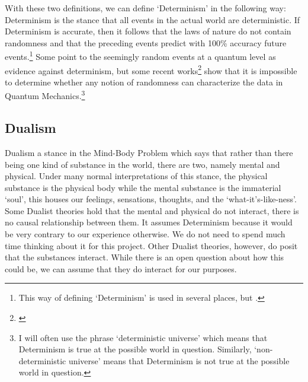 With these two definitions, we can define ‘Determinism' in the following way: Determinism is the stance that all events in the actual world are deterministic. If Determinism is accurate, then it follows that the laws of nature do not contain randomness and that the preceding events predict with 100\% accuracy future events.\footnote{This way of defining ‘Determinism’ is used in several places, but \cite[most notably in][ ]{Popper1}.}  Some point to the seemingly random events at a quantum level as evidence against determinism, but some recent works\footnote{\cite{Barrett1}}  show that it is impossible to determine whether any notion of randomness can characterize the data in Quantum Mechanics.\footnote{I will often use the phrase ‘deterministic universe’ which means that Determinism is true at the possible world in question. Similarly, ‘non-deterministic universe’ means that Determinism is not true at the possible world in question.}
\subsection{Dualism}
Dualism a stance in the Mind-Body Problem which says that rather than there being one kind of substance in the world, there are two, namely mental and physical. Under many normal interpretations of this stance, the physical substance is the physical body while the mental substance is the immaterial ‘soul’, this houses our feelings, sensations, thoughts, and the ‘what-it’s-like-ness’. Some Dualist theories hold that the mental and physical do not interact, there is no causal relationship between them. It assumes Determinism because it would be very contrary to our experience otherwise. We do not need to spend much time thinking about it for this project. Other Dualist theories, however, do posit that the substances interact. While there is an open question about how this could be, we can assume that they do interact for our purposes. 
